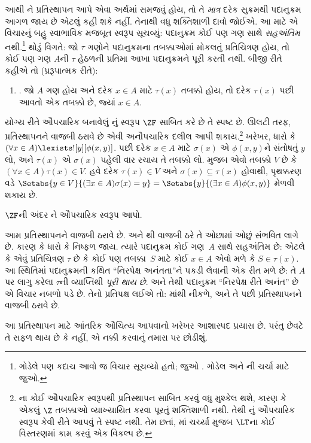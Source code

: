 \documentclass[../../../include/open-logic-section]{subfiles}
\begin{document}
આથી \stagesinex{}ને પ્રતિસ્થાપન આપે એવા અર્થમાં
સમજવું હોય, તો તે \emph{માત્ર} દરેક સુક્રમથી
પદાનુક્રમ આગળ જાય છે એટલું કહી શકે નહીં. તેનાથી
વધુ શક્તિશાળી દાવો જોઈએ. આ માટે \cite{Shoenfield:AST}એ
વિચારનું બહુ સ્વાભાવિક મજબૂત સ્વરૂપ સૂચવ્યું: પદાનુક્રમ
કોઈ પણ ગણ સાથે \emph{સહઅંતિમ} નથી.\footnote{ગોડેલે
પણ કદાચ આવો જ વિચાર સૂચવ્યો હતો; જુઓ
\citet[p.~223]{Potter2004}. ગોડેલ અને
\citeauthor{Shoenfield:AST}ની ચર્ચા માટે
\citet[90--5]{Incurvati2020} જુઓ.} થોડું વિગતે:
જો $\tau$ ગણોને પદાનુક્રમના તબક્કાઓમાં મોકલતું
પ્રતિચિત્રણ હોય, તો કોઈ પણ ગણ $A$ની $\tau$ હેઠળની
પ્રતિમા આખા પદાનુક્રમને પૂરી કરતી નથી. બીજી રીતે
કહીએ તો (પ્રરૂપાત્મક રીતે):
\begin{enumerate}
	\item[] \stagescofin. જો $A$ ગણ હોય અને દરેક
	$x \in A$ માટે $\tau(x)$ તબક્કો હોય, તો દરેક
	$\tau(x)$ પછી આવતો એક તબક્કો છે, જ્યાં $x \in A$.
\end{enumerate}
યોગ્ય રીતે ઔપચારિક બનાવેલું \stagescofin{}નું સ્વરૂપ
$\ZF$ સાબિત કરે છે તે સ્પષ્ટ છે. ઊલટી તરફ,
\stagescofin{} પ્રતિસ્થાપનને વાજબી ઠરાવે છે એવી
અનૌપચારિક દલીલ આપી શકાય.\footnote{\stagescofin{}ના
કોઈ ઔપચારિક સ્વરૂપથી પ્રતિસ્થાપન સાબિત કરવું વધુ મુશ્કેલ
થશે, કારણ કે એકલું $\Z$ તબક્કાઓ વ્યાખ્યાયિત કરવા
પૂરતું શક્તિશાળી નથી. તેથી \stagescofin{}નું
ઔપચારિક સ્વરૂપ કેવી રીતે આપવું તે સ્પષ્ટ નથી. તેમ છતાં,
માં ચર્ચ્યા મુજબ
$\LT$ના કોઈ વિસ્તરણમાં કામ કરવું એક વિકલ્પ છે.}
ખરેખર, ધારો કે $(\forall x \in A)\lexists![y][\phi(x,y)]$.
પછી દરેક $x \in A$ માટે $\sigma(x)$ એ
$\phi(x,y)$ને સંતોષતું $y$ લો, અને $\tau(x)$ એ
$\sigma(x)$ પહેલી વાર રચાય તે તબક્કો લો.
\stagescofin{} મુજબ એવો તબક્કો $V$ છે કે
$(\forall x \in A)\tau(x)\in V$. હવે દરેક
$\tau(x) \in V$ અને $\sigma(x) \subseteq \tau(x)$
હોવાથી, પૃથક્કરણ વડે
$\Setabs{y
\in V}{(\exists x \in A)\sigma(x) = y} = \Setabs{y}{(\exists x \in
A)\phi(x,y)}$ મેળવી શકાય છે.

\begin{prob}
	$\ZF$ની અંદર \stagescofin{}ને ઔપચારિક સ્વરૂપ આપો.
\end{prob}

આમ \stagescofin{} પ્રતિસ્થાપનને વાજબી ઠરાવે છે.
અને \stagesinex{}થી \stagescofin{} વાજબી ઠરે તે
ઓછામાં ઓછું સંભવિત લાગે છે. કારણ કે ધારો કે
\stagescofin{} નિષ્ફળ જાય. ત્યારે પદાનુક્રમ કોઈ ગણ~$A$
સાથે સહઅંતિમ છે: એટલે કે એવું પ્રતિચિત્રણ $\tau$ છે
કે કોઈ પણ તબક્કા~$S$ માટે કોઈ $x \in A$ એવો મળે
કે $S \in \tau(x)$. આ સ્થિતિમાં પદાનુક્રમની કથિત
``નિરપેક્ષ અનંતતા''ને પકડી લેવાની એક રીત મળે છે:
તે $A$ પર લાગુ કરેલા $\tau$ની વ્યાપ્તિથી
\emph{પૂરી થાય છે}. અને તેથી પદાનુક્રમ ``નિરપેક્ષ
રીતે અનંત'' છે એ વિચાર નબળો પડે છે. તેનો પ્રતિપક્ષ
લઈએ તો: \stagesinex{}માંથી \stagescofin{} નીકળે,
અને તે પછી પ્રતિસ્થાપનને વાજબી ઠરાવે છે.

આ પ્રતિસ્થાપન માટે આંતરિક ઔચિત્ય આપવાનો ખરેખર
આશાસ્પદ પ્રયાસ છે. પરંતુ છેવટે તે સફળ થાય છે કે
નહીં, એ નક્કી કરવાનું તમારા પર છોડીશું.
\end{document}
